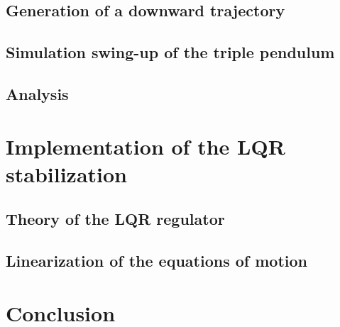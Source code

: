 \documentclass[a4paper,12pt,twoside]{article}
\begin{document}
\subsection{Generation of a downward trajectory}

\subsection{Simulation swing-up of the triple pendulum}

\subsection{Analysis}

\section{Implementation of the LQR stabilization}
\subsection{Theory of the LQR regulator}

\subsection{Linearization of the equations of motion}
\section{Conclusion}


\appendix
\nocite{*}


\end{document}
